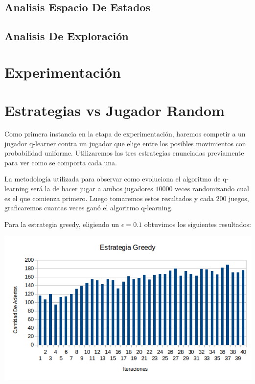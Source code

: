 \subsection{Analisis Espacio De Estados}


\subsection{Analisis De Exploración}


\section{Experimentación}

\section{Estrategias vs Jugador Random}

Como primera instancia en la etapa de experimentación, haremos competir a un jugador q-learner contra un jugador que elige entre los posibles movimientos con probabilidad uniforme. Utilizaremos las tres estrategias enunciadas previamente para ver como se comporta cada una. 

La metodología utilizada para observar como evoluciona el algoritmo de q-learning será la de hacer jugar a ambos jugadores $10000$ veces randomizando cual es el que comienza primero. Luego tomaremos estos resultados y cada $200$ juegos, graficaremos cuantas veces ganó el algoritmo q-learning. 

Para la estrategia greedy, eligiendo un $\epsilon=0.1$ obtuvimos los siguientes resultados:

\includegraphics[scale=0.5]{testing/greedy.png}

